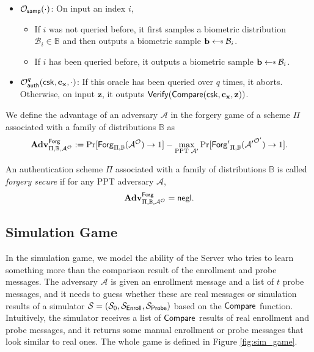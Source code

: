 \begin{itemize}
	\item $\mathcal{O}_{\sf samp}(\cdot)$: On input an index $i$,
	\begin{itemize}
		\item If $i$ was not queried before, it first samples a biometric distribution $\mathcal{B}_i \in \mathbb{B}$ and then outputs a biometric sample $\mathbf{b} \getsdollar \mathcal{B}_i$.
		\item If $i$ has been queried before, it outputs a biometric sample $\mathbf{b} \getsdollar \mathcal{B}_i$.
	\end{itemize}
	
	\item $\mathcal{O}_{\sf auth}^{q}({\sf csk}, \mathbf{c_x}, \cdot)$: If this oracle has been queried over $q$ times, it aborts. Otherwise, on input $\mathbf{z}$, it outputs ${\sf Verify}({\sf Compare}({\sf csk}, \mathbf{c_x}, \mathbf{z}))$.
\end{itemize}


We define the advantage of an adversary $\mathcal{A}$ in the forgery game of a scheme $\Pi$ associated with a family of distributions $\mathbb{B}$ as
\[
	\mathbf{Adv}^{\sf Forg}_{\Pi, \mathbb{B}, \mathcal{A}^\mathcal{O}} := \Pr[{\sf Forg}_{\Pi, \mathbb{B}}(\mathcal{A}^\mathcal{O}) \to 1] -
	\max_{\text{PPT } \mathcal{A'}} \Pr[{\sf Forg'}_{\Pi, \mathbb{B}}(\mathcal{A'}^\mathcal{O'}) \to 1].
\]

An authentication scheme $\Pi$ associated with a family of distributions $\mathbb{B}$ is called \emph{forgery secure} if for any PPT adversary $\mathcal{A}$,
\[
	\mathbf{Adv}^{\sf Forg}_{\Pi, \mathbb{B}, \mathcal{A^\mathcal{O}}} = \mathsf{negl}.
\]


\subsection{Simulation Game}
\label{sec:simulation_game}

In the simulation game, we model the ability of the {\sf Server} who tries to learn something more than the comparison result of the enrollment and probe messages. The adversary $\mathcal{A}$ is given an enrollment message and a list of $t$ probe messages, and it needs to guess whether these are real messages or simulation results of a simulator $\mathcal{S} = (\mathcal{S}_0, \mathcal{S}_{\sf Enroll}, \mathcal{S}_{\sf Probe})$ based on the $\sf Compare$ function. Intuitively, the simulator receives a list of $\sf Compare$ results of real enrollment and probe messages, and it returns some manual enrollment or probe messages that look similar to real ones. The whole game is defined in Figure \ref{fig:sim_game}.


